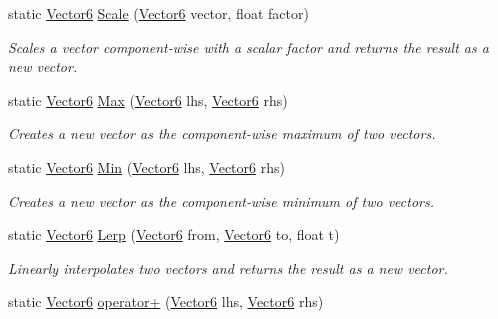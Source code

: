 \begin{DoxyCompactItemize}
static \hyperlink{class_grid_framework_1_1_vectors_1_1_vector6}{Vector6} \hyperlink{class_grid_framework_1_1_vectors_1_1_vector6_af1b84072dea3102258eb7bd22a9e5d7c_af1b84072dea3102258eb7bd22a9e5d7c}{Scale} (\hyperlink{class_grid_framework_1_1_vectors_1_1_vector6}{Vector6} vector, float factor)
\begin{DoxyCompactList}\small\item\em Scales a vector component-\/wise with a scalar factor and returns the result as a new vector.\end{DoxyCompactList}\item 
static \hyperlink{class_grid_framework_1_1_vectors_1_1_vector6}{Vector6} \hyperlink{class_grid_framework_1_1_vectors_1_1_vector6_a6d79343eb75e1a4360dc320591908f13_a6d79343eb75e1a4360dc320591908f13}{Max} (\hyperlink{class_grid_framework_1_1_vectors_1_1_vector6}{Vector6} lhs, \hyperlink{class_grid_framework_1_1_vectors_1_1_vector6}{Vector6} rhs)
\begin{DoxyCompactList}\small\item\em Creates a new vector as the component-\/wise maximum of two vectors.\end{DoxyCompactList}\item 
static \hyperlink{class_grid_framework_1_1_vectors_1_1_vector6}{Vector6} \hyperlink{class_grid_framework_1_1_vectors_1_1_vector6_a849b7f01651b72bbaf876369303351c1_a849b7f01651b72bbaf876369303351c1}{Min} (\hyperlink{class_grid_framework_1_1_vectors_1_1_vector6}{Vector6} lhs, \hyperlink{class_grid_framework_1_1_vectors_1_1_vector6}{Vector6} rhs)
\begin{DoxyCompactList}\small\item\em Creates a new vector as the component-\/wise minimum of two vectors.\end{DoxyCompactList}\item 
static \hyperlink{class_grid_framework_1_1_vectors_1_1_vector6}{Vector6} \hyperlink{class_grid_framework_1_1_vectors_1_1_vector6_aa199e0b3ec5a239f4bbf11f49f082515_aa199e0b3ec5a239f4bbf11f49f082515}{Lerp} (\hyperlink{class_grid_framework_1_1_vectors_1_1_vector6}{Vector6} from, \hyperlink{class_grid_framework_1_1_vectors_1_1_vector6}{Vector6} to, float t)
\begin{DoxyCompactList}\small\item\em Linearly interpolates two vectors and returns the result as a new vector.\end{DoxyCompactList}\item 
static \hyperlink{class_grid_framework_1_1_vectors_1_1_vector6}{Vector6} \hyperlink{class_grid_framework_1_1_vectors_1_1_vector6_ac997ff251a71b75e69048b6e05aba8ec_ac997ff251a71b75e69048b6e05aba8ec}{operator+} (\hyperlink{class_grid_framework_1_1_vectors_1_1_vector6}{Vector6} lhs, \hyperlink{class_grid_framework_1_1_vectors_1_1_vector6}{Vector6} rhs)

\end{DoxyCompactItemize}
